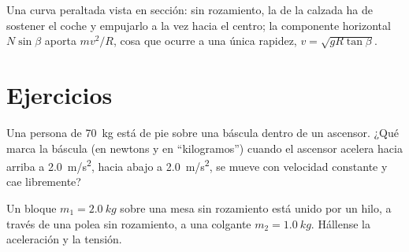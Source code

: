 \begin{omfigure}

{\small Una curva peraltada vista en sección: sin rozamiento, la  de la calzada ha de sostener el coche y empujarlo a la vez hacia el
centro; la componente horizontal $N\sin\beta$ aporta $mv^2/R$, cosa que
ocurre a una única rapidez, $v = \sqrt{gR\tan\beta}$.}
\end{omfigure}

\section{Ejercicios}

\begin{exercise}[$\star$]\label{exo:b1:newton-dynamics:1}
Una persona de \qty{70}{kg} está de pie sobre una báscula dentro de un
ascensor. ¿Qué marca la báscula (en newtons y en ``kilogramos'') cuando el
ascensor acelera hacia arriba a \qty{2.0}{m/s^2}, hacia abajo a
\qty{2.0}{m/s^2}, se mueve con velocidad constante y cae libremente?
\end{exercise}

\begin{exercise}[$\star$]\label{exo:b1:newton-dynamics:2}
Un bloque $m_1 = \qty{2.0}{kg}$ sobre una mesa sin rozamiento está unido
por un hilo, a través de una polea sin rozamiento, a una  colgante
$m_2 = \qty{1.0}{kg}$. Hállense la aceleración y la tensión.
\end{exercise}

